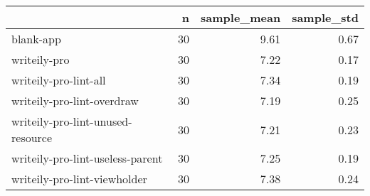 \begin{tabular}{lrrr}
\toprule
{} &   n &  sample\_mean &  sample\_std \\
\midrule
blank-app                         &  30 &         9.61 &        0.67 \\
writeily-pro                      &  30 &         7.22 &        0.17 \\
writeily-pro-lint-all             &  30 &         7.34 &        0.19 \\
writeily-pro-lint-overdraw        &  30 &         7.19 &        0.25 \\
writeily-pro-lint-unused-resource &  30 &         7.21 &        0.23 \\
writeily-pro-lint-useless-parent  &  30 &         7.25 &        0.19 \\
writeily-pro-lint-viewholder      &  30 &         7.38 &        0.24 \\
\bottomrule
\end{tabular}
